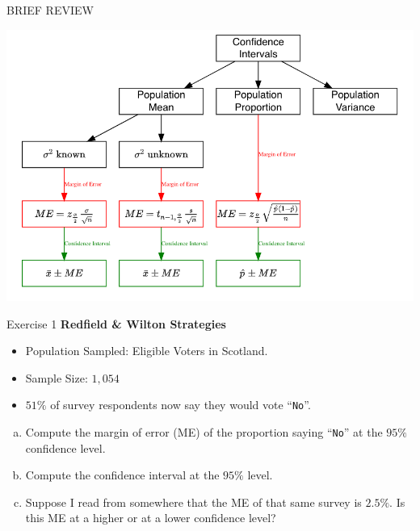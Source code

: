 \documentclass[
  11pt,
  ignorenonframetext,
]{beamer}
\providecommand{\tightlist}{%
  \setlength{\itemsep}{0pt}\setlength{\parskip}{0pt}}
\begin{document}
\begin{frame}{BRIEF REVIEW}
\begin{center}\includegraphics[width=0.9\linewidth]{pictures/CI_BriefReview} \end{center}
\end{frame}

\begin{frame}[fragile]{Exercise 1}
\protect\hypertarget{exercise-1}{}
\textbf{Redfield \& Wilton Strategies}

\begin{itemize}
\tightlist
\item
  Population Sampled: Eligible Voters in Scotland.
\item
  Sample Size: \(1,054\)
\item
  \(51\%\) of survey respondents now say they would vote
  ``\texttt{No}''.
\end{itemize}

\begin{enumerate}
[(a)]
\tightlist
\item
  Compute the margin of error (ME) of the proportion saying
  ``\texttt{No}'' at the \(95\%\) confidence level.
\item
  Compute the confidence interval at the \(95\%\) level.
\item
  Suppose I read from somewhere that the ME of that same survey is
  \(2.5\%\). Is this ME at a higher or at a lower confidence level?
\end{enumerate}
\end{frame}
\end{document}
